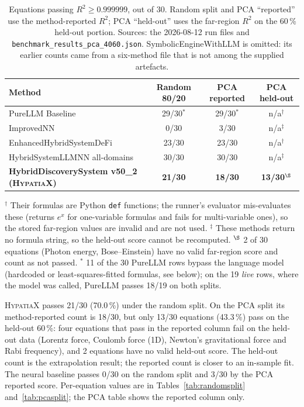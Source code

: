 \documentclass[twoside,11pt]{article}
\newcommand{\Rsq}{R^{2}}
\begin{document}
\begin{table}[h]
\centering
\caption{Equations passing $\Rsq \geq 0.999999$, out of 30. Random split and PCA ``reported'' use the
  method-reported $\Rsq$; PCA ``held-out'' uses the far-region $\Rsq$ on the 60\,\% held-out portion.
  Sources: the 2026-08-12 run files and \texttt{benchmark\_results\_pca\_4060.json}. SymbolicEngineWithLLM is omitted: its earlier counts came from a six-method file that is not among the supplied artefacts.}
\label{tab:feynman30-methods}
\small
\begin{tabular}{lccc}
\toprule
Method & Random 80/20 & PCA reported & PCA held-out \\
\midrule
PureLLM Baseline & 29/30$^\ast$ & 29/30$^\ast$ & n/a$^\dagger$ \\
ImprovedNN & 0/30 & 3/30 & n/a$^\ddagger$ \\
EnhancedHybridSystemDeFi & 23/30 & 23/30 & n/a$^\dagger$ \\
HybridSystemLLMNN all-domains & 30/30 & 30/30 & n/a$^\ddagger$ \\
\textbf{HybridDiscoverySystem v50\_2 (\textsc{HypatiaX})} & \textbf{21/30} & \textbf{18/30} & \textbf{13/30}$^\S$ \\
\bottomrule
\end{tabular}

{\footnotesize $^\dagger$ Their formulas are Python \texttt{def} functions; the runner's evaluator
mis-evaluates these (returns $e^{x}$ for one-variable formulas and fails for multi-variable ones), so the
stored far-region values are invalid and are not used. $^\ddagger$ These methods return no formula string, so the held-out score cannot be recomputed.
$^\S$ 2 of 30 equations (Photon energy, Bose--Einstein) have no valid far-region score and count as not passed.
$^\ast$ 11 of the 30 PureLLM rows bypass the language model (hardcoded or least-squares-fitted formulas, see below); on the 19 \emph{live} rows, where the model was called, PureLLM passes 18/19 on both splits.}
\end{table}

\textsc{HypatiaX} passes 21/30 (70.0\,\%) under the random split. On the PCA split its method-reported
count is 18/30, but only 13/30 equations (43.3\,\%) pass on the held-out 60\,\%: four equations that pass in
the reported column fail on the held-out data (Lorentz force, Coulomb force (1D), Newton's gravitational force and
Rabi frequency), and 2 equations have no valid held-out score. The
held-out count is the extrapolation result; the reported count is closer to an in-sample fit. The neural baseline
passes 0/30 on the random split and 3/30 by the PCA reported score. Per-equation values are in
Tables~\ref{tab:randomsplit} and~\ref{tab:pcasplit}; the PCA table shows the reported column only.
\end{document}
